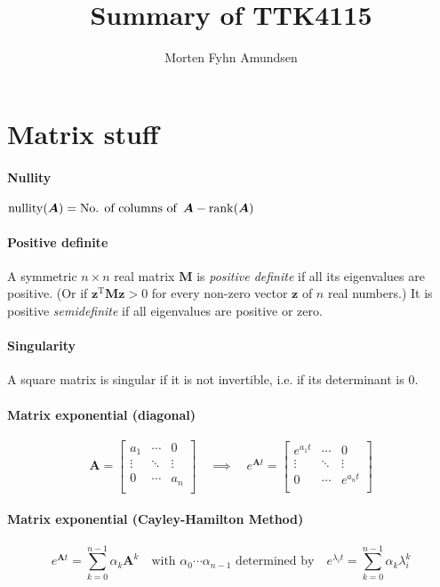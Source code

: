 \documentclass[a4paper]{article}
\title{Summary of TTK4115}
\author{Morten Fyhn Amundsen}
\affil{NTNU}
\newcommand{\M}[1]{\bm{#1}}
\newcommand{\V}[1]{\mathbf{#1}}
\newcommand{\transpose}{^{\text{T}}}
\begin{document}
\maketitle



\section{Matrix stuff}
\paragraph{Nullity} $\operatorname{nullity}(\M{A}) = \operatorname{\textup{No. of columns of }} \M{A} - \operatorname{rank}(\M{A})$
\paragraph{Positive definite} A symmetric $n \times n$ real matrix $\M{M}$ is \emph{positive definite} if all its eigenvalues are positive. (Or if $\V{z}\transpose \M{M}\V{z} > 0$ for every non-zero vector $\V{z}$ of $n$ real numbers.) It is positive \emph{semidefinite} if all eigenvalues are positive or zero.
\paragraph{Singularity} A square matrix is singular if it is not invertible, i.e. if its determinant is $0$.
\paragraph{Matrix exponential (diagonal)}
$$\M{A} =
\begin{bmatrix}
a_1		& \cdots	& 0			\\
\vdots 	& \ddots	& \vdots	\\
0		& \cdots	& a_n		\\
\end{bmatrix}
\quad \implies \quad
e^{\M{A}t} =
\begin{bmatrix}
e^{a_1t}	& \cdots	& 0			\\
\vdots 		& \ddots	& \vdots	\\
0			& \cdots	& e^{a_nt}	\\
\end{bmatrix}$$
\paragraph{Matrix exponential (Cayley-Hamilton Method)}
$$e^{\M{A}t} = \sum_{k=0}^{n-1} \alpha_k \M{A}^k
\quad \text {with } \alpha_0 \cdots \alpha_{n-1} \text{ determined by} \quad
e^{\lambda_i t} = \sum_{k=0}^{n-1} \alpha_k \lambda_i^k$$
\end{document}
